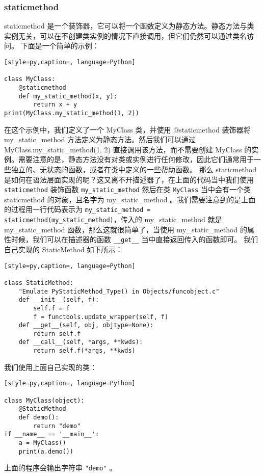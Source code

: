 \subsubsection{staticmethod}
staticmethod 是一个装饰器，它可以将一个函数定义为静态方法。静态方法与类实例无关，可以在不创建类实例的情况下直接调用，但它们仍然可以通过类名访问。
下面是一个简单的示例：
\begin{lstlisting}[style=py,caption=, language=Python]

class MyClass:
    @staticmethod
    def my_static_method(x, y):
        return x + y
print(MyClass.my_static_method(1, 2))
\end{lstlisting}
在这个示例中，我们定义了一个 MyClass 类，并使用 @staticmethod 装饰器将 my\_static\_method 方法定义为静态方法。然后我们可以通过 MyClass.my\_static\_method(1, 2) 直接调用该方法，而不需要创建 MyClass 的实例。需要注意的是，静态方法没有对类或实例进行任何修改，因此它们通常用于一些独立的、无状态的函数，或者在类中定义的一些帮助函数。
那么 staticmethod 是如何在语法层面实现的呢？这又离不开描述器了，在上面的代码当中我们使用 \verb|staticmethod| 装饰函数 \verb|my_static_method| 然后在类 \verb|MyClass| 当中会有一个类 staticmethod 的对象，且名字为 my\_static\_method 。我们需要注意到的是上面的过程用一行代码表示为 \verb|my_static_method = staticmethod(my_static_method)|，传入的 my\_static\_method 就是 my\_static\_method 函数，那么这就很简单了，当使用 my\_static\_method 的属性时候，我们可以在描述器的函数 \verb|__get__| 当中直接返回传入的函数即可。
我们自己实现的 StaticMethod 如下所示：
\begin{lstlisting}[style=py,caption=, language=Python]

class StaticMethod:
    "Emulate PyStaticMethod_Type() in Objects/funcobject.c"
    def __init__(self, f):
        self.f = f
        f = functools.update_wrapper(self, f)
    def __get__(self, obj, objtype=None):
        return self.f
    def __call__(self, *args, **kwds):
        return self.f(*args, **kwds)
\end{lstlisting}
我们使用上面自己实现的类：
\begin{lstlisting}[style=py,caption=, language=Python]

class MyClass(object):
    @StaticMethod
    def demo():
        return "demo"
if __name__ == '__main__':
    a = MyClass()
    print(a.demo())
\end{lstlisting}
上面的程序会输出字符串 \verb|"demo"| 。
